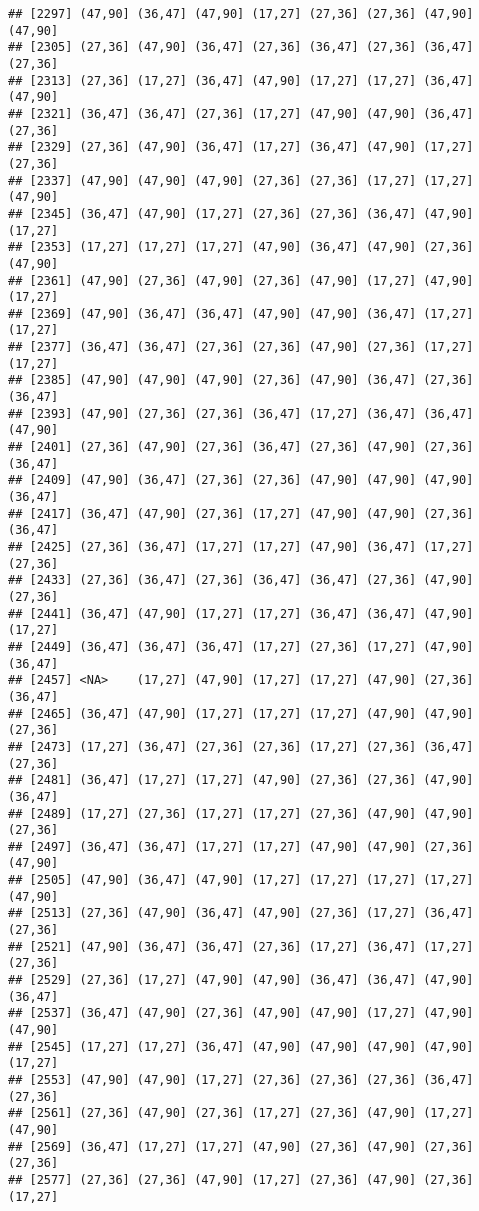 \documentclass[12pt,]{article}
\begin{document}
\begin{verbatim}
## [2297] (47,90] (36,47] (47,90] (17,27] (27,36] (27,36] (47,90] (47,90]
## [2305] (27,36] (47,90] (36,47] (27,36] (36,47] (27,36] (36,47] (27,36]
## [2313] (27,36] (17,27] (36,47] (47,90] (17,27] (17,27] (36,47] (47,90]
## [2321] (36,47] (36,47] (27,36] (17,27] (47,90] (47,90] (36,47] (27,36]
## [2329] (27,36] (47,90] (36,47] (17,27] (36,47] (47,90] (17,27] (27,36]
## [2337] (47,90] (47,90] (47,90] (27,36] (27,36] (17,27] (17,27] (47,90]
## [2345] (36,47] (47,90] (17,27] (27,36] (27,36] (36,47] (47,90] (17,27]
## [2353] (17,27] (17,27] (17,27] (47,90] (36,47] (47,90] (27,36] (47,90]
## [2361] (47,90] (27,36] (47,90] (27,36] (47,90] (17,27] (47,90] (17,27]
## [2369] (47,90] (36,47] (36,47] (47,90] (47,90] (36,47] (17,27] (17,27]
## [2377] (36,47] (36,47] (27,36] (27,36] (47,90] (27,36] (17,27] (17,27]
## [2385] (47,90] (47,90] (47,90] (27,36] (47,90] (36,47] (27,36] (36,47]
## [2393] (47,90] (27,36] (27,36] (36,47] (17,27] (36,47] (36,47] (47,90]
## [2401] (27,36] (47,90] (27,36] (36,47] (27,36] (47,90] (27,36] (36,47]
## [2409] (47,90] (36,47] (27,36] (27,36] (47,90] (47,90] (47,90] (36,47]
## [2417] (36,47] (47,90] (27,36] (17,27] (47,90] (47,90] (27,36] (36,47]
## [2425] (27,36] (36,47] (17,27] (17,27] (47,90] (36,47] (17,27] (27,36]
## [2433] (27,36] (36,47] (27,36] (36,47] (36,47] (27,36] (47,90] (27,36]
## [2441] (36,47] (47,90] (17,27] (17,27] (36,47] (36,47] (47,90] (17,27]
## [2449] (36,47] (36,47] (36,47] (17,27] (27,36] (17,27] (47,90] (36,47]
## [2457] <NA>    (17,27] (47,90] (17,27] (17,27] (47,90] (27,36] (36,47]
## [2465] (36,47] (47,90] (17,27] (17,27] (17,27] (47,90] (47,90] (27,36]
## [2473] (17,27] (36,47] (27,36] (27,36] (17,27] (27,36] (36,47] (27,36]
## [2481] (36,47] (17,27] (17,27] (47,90] (27,36] (27,36] (47,90] (36,47]
## [2489] (17,27] (27,36] (17,27] (17,27] (27,36] (47,90] (47,90] (27,36]
## [2497] (36,47] (36,47] (17,27] (17,27] (47,90] (47,90] (27,36] (47,90]
## [2505] (47,90] (36,47] (47,90] (17,27] (17,27] (17,27] (17,27] (47,90]
## [2513] (27,36] (47,90] (36,47] (47,90] (27,36] (17,27] (36,47] (27,36]
## [2521] (47,90] (36,47] (36,47] (27,36] (17,27] (36,47] (17,27] (27,36]
## [2529] (27,36] (17,27] (47,90] (47,90] (36,47] (36,47] (47,90] (36,47]
## [2537] (36,47] (47,90] (27,36] (47,90] (47,90] (17,27] (47,90] (47,90]
## [2545] (17,27] (17,27] (36,47] (47,90] (47,90] (47,90] (47,90] (17,27]
## [2553] (47,90] (47,90] (17,27] (27,36] (27,36] (27,36] (36,47] (27,36]
## [2561] (27,36] (47,90] (27,36] (17,27] (27,36] (47,90] (17,27] (47,90]
## [2569] (36,47] (17,27] (17,27] (47,90] (27,36] (47,90] (27,36] (27,36]
## [2577] (27,36] (27,36] (47,90] (17,27] (27,36] (47,90] (27,36] (17,27]

\end{verbatim}
\end{document}

